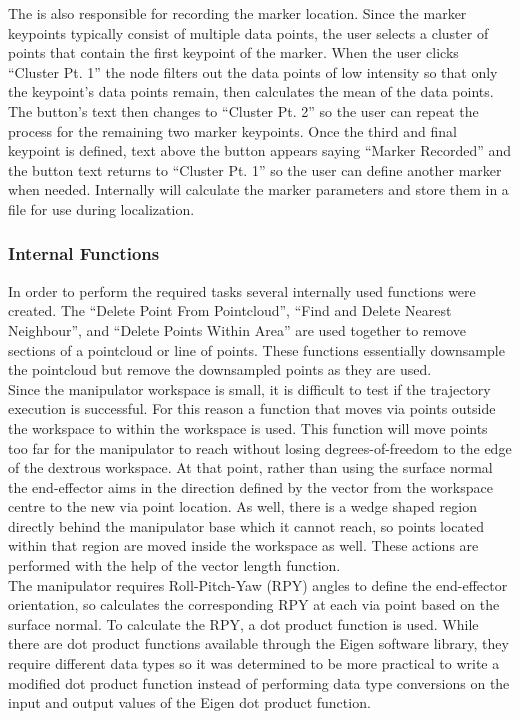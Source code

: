 The  is also responsible for recording the marker location. Since the marker keypoints typically consist of multiple data points, the user selects a cluster of points that contain the first keypoint of the marker. When the user clicks ``Cluster Pt. 1''  the node filters out the data points of low intensity so that only the keypoint's data points remain, then calculates the mean of the data points. The button's text then changes to ``Cluster Pt. 2'' so the user can repeat the process for the remaining two marker keypoints. Once the third and final keypoint is defined, text above the button appears saying ``Marker Recorded'' and the button text returns to ``Cluster Pt. 1'' so the user can define another marker when needed. Internally  will calculate the marker parameters and store them in a file for use during localization.\\
\subsubsection{Internal Functions}
In order to perform the required tasks several internally used functions were created. The ``Delete Point From Pointcloud'', ``Find and Delete Nearest Neighbour'', and ``Delete Points Within Area'' are used together to remove sections of a pointcloud or line of points. These functions essentially downsample the pointcloud but remove the downsampled points as they are used.\\

Since the manipulator workspace is small, it is difficult to test if the trajectory execution is successful. For this reason a function that moves via points outside the workspace to within the workspace is used. This function will move points too far for the manipulator to reach without losing degrees-of-freedom to the edge of the dextrous workspace. At that point, rather than using the surface normal the end-effector aims in the direction defined by the vector from the workspace centre to the new via point location. As well, there is a wedge shaped region directly behind the manipulator base which it cannot reach, so points located within that region are moved inside the workspace as well. These actions are performed with the help of the vector length function.\\

The manipulator requires Roll-Pitch-Yaw (RPY) angles to define the end-effector orientation, so  calculates the corresponding RPY at each via point based on the surface normal. To calculate the RPY, a dot product function is used. While there are dot product functions available through the Eigen software library, they require different data types so it was determined to be more practical to write a modified dot product function instead of performing data type conversions on the input and output values of the Eigen dot product function.\\

